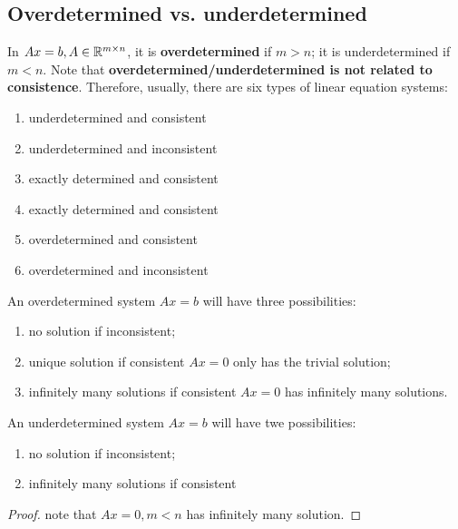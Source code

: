 \begin{refsection}
\subsection{Overdetermined vs. underdetermined}
\begin{definition}
In $Ax = b,A\in \mathbb{R}^{m\times n}$, it is \textbf{overdetermined} if $m > n$; it is underdetermined if $m < n$. 
Note that \textbf{overdetermined/underdetermined is not related to consistence}. Therefore, usually, there are six types of linear equation systems:
\begin{enumerate}
    \item underdetermined and consistent
    \item underdetermined and inconsistent
    \item exactly determined and consistent
    \item exactly determined and consistent
    \item overdetermined and consistent
    \item overdetermined and inconsistent
\end{enumerate}
\end{definition}

\begin{lemma}
An overdetermined system $Ax = b$ will have three possibilities:
\begin{enumerate}
\item no solution if inconsistent;
\item unique solution if consistent $Ax = 0$ only has the trivial  solution;
\item infinitely many solutions if consistent $Ax = 0$ has infinitely many solutions.
\end{enumerate}
\end{lemma}

\begin{lemma}\label{ch:linearalgebra:th:solutionunderterminedsystem}
An underdetermined system $Ax = b$ will have twe possibilities:
\begin{enumerate}
\item no solution if inconsistent;
\item infinitely many solutions if consistent 
\end{enumerate}
\end{lemma}
\begin{proof}
note that $Ax = 0, m < n$ has infinitely many solution.
\end{proof}


\end{refsection}
